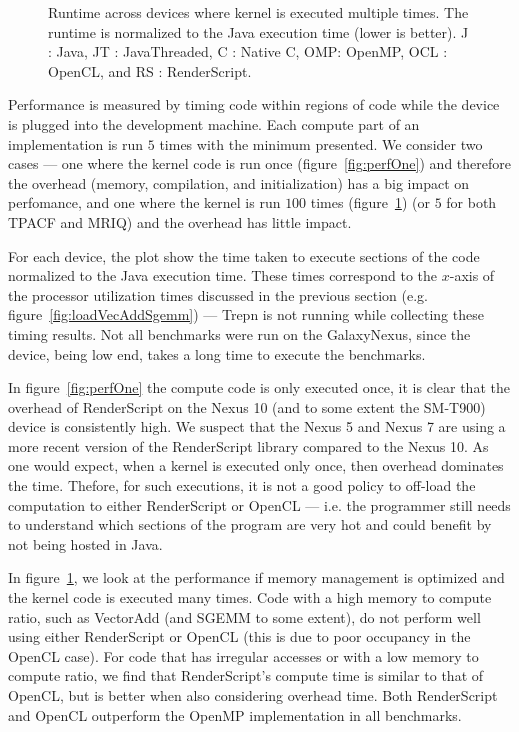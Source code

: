 \begin{figure}
  \caption{Runtime across devices where kernel is executed multiple times. The runtime is normalized to the Java execution time (lower is better). J : Java, JT : JavaThreaded, C : Native C, OMP: OpenMP, OCL : OpenCL, and RS : RenderScript.}
  \label{fig:perfMany}
\end{figure}


Performance is measured by timing code within regions of code while the device is plugged into the development machine.
Each compute part of an implementation is run $5$ times with the minimum
  presented.
We consider two cases --- one where the kernel code is run once (figure~\ref{fig:perfOne}) and therefore
  the overhead (memory, compilation, and initialization) has a big impact on perfomance,
  and one where the kernel is run $100$ times (figure~\ref{fig:perfMany}) (or $5$ for both TPACF and MRIQ)
  and the overhead has little impact.

For each device, the plot show the time taken to execute sections of the code normalized
  to the Java execution time.
These times correspond to the $x$-axis of the processor utilization times discussed
  in the previous section (e.g. figure~\ref{fig:loadVecAddSgemm}) --- Trepn is not
  running while collecting these timing results.
Not all benchmarks were run on the GalaxyNexus, since the device,
  being low end, takes a long time to execute the benchmarks.

In figure~\ref{fig:perfOne} the compute code is only executed once, it is clear that 
  the overhead of RenderScript on the Nexus 10 (and to some extent the SM-T900) device is consistently high.
We suspect that the Nexus 5 and Nexus 7 are using a more recent version of the RenderScript library compared to the Nexus 10.
As one would expect, when a kernel is executed only once, then overhead dominates the time. Thefore, for such executions, it is not a good policy to off-load the computation to either RenderScript or OpenCL ---
  i.e. the programmer still needs to understand which sections of the program are very hot and could benefit by not being hosted 
  in Java.

In figure~\ref{fig:perfMany}, we look at the performance if memory management is optimized and the kernel code is executed 
  many times.
Code with a high memory to compute ratio, such as VectorAdd (and SGEMM to some extent), do not perform well using either
  RenderScript or OpenCL (this is due to poor occupancy in the OpenCL case).
For code that has irregular accesses or with a low memory to compute ratio, we find that RenderScript's compute time is similar
  to that of OpenCL, but is better when also considering overhead time.
Both RenderScript and OpenCL outperform the OpenMP implementation in all benchmarks.

